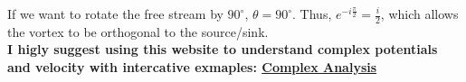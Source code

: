 \documentclass{article}
\begin{document}
If we want to rotate the free stream by $90^\circ$, $\theta=90^\circ$. Thus, $e^{-i\frac{\pi}{2}}=\frac{i}{2}$, which allows the vortex to be orthogonal to the source/sink.\\
\textbf{I higly suggest using this website to understand complex potentials and velocity with intercative exmaples: \href{https://complex-analysis.com/content/mappings.html}{Complex Analysis}}
\end{document}
